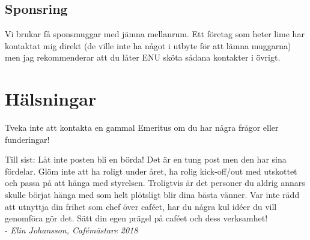 \documentclass[10pt]{article}
\begin{document}
\subsection{Sponsring}
Vi brukar få sponsmuggar med jämna mellanrum. Ett företag som heter lime har kontaktat mig direkt (de ville inte ha något i utbyte för att lämna muggarna) men jag rekommenderar att du låter ENU sköta sådana kontakter i övrigt. 

\section{Hälsningar}
Tveka inte att kontakta en gammal Emeritus om du har några frågor eller funderingar!

Till sist: Låt inte posten bli en börda! Det är en tung post men den har sina fördelar. Glöm inte att ha roligt under året, ha rolig kick-off/out med utskottet och passa på att hänga med styrelsen. Troligtvis är det personer du aldrig annars skulle börjat hänga med som helt plötsligt blir dina bästa vänner. Var inte rädd att utnyttja din frihet som chef över caféet, har du några kul idéer du vill genomföra gör det. Sätt din egen prägel på caféet och dess verksamhet!\\
- \textit{Elin Johansson, Cafémästare 2018}
\end{document}
